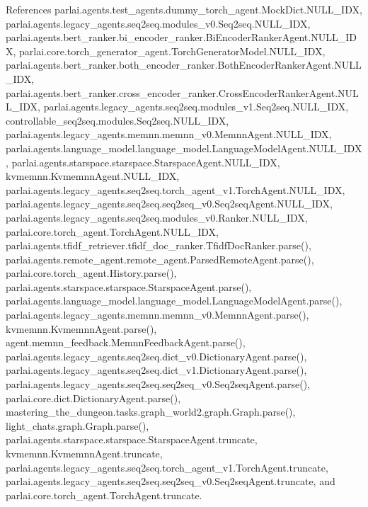 References parlai.\+agents.\+test\+\_\+agents.\+dummy\+\_\+torch\+\_\+agent.\+Mock\+Dict.\+N\+U\+L\+L\+\_\+\+I\+DX, parlai.\+agents.\+legacy\+\_\+agents.\+seq2seq.\+modules\+\_\+v0.\+Seq2seq.\+N\+U\+L\+L\+\_\+\+I\+DX, parlai.\+agents.\+bert\+\_\+ranker.\+bi\+\_\+encoder\+\_\+ranker.\+Bi\+Encoder\+Ranker\+Agent.\+N\+U\+L\+L\+\_\+\+I\+DX, parlai.\+core.\+torch\+\_\+generator\+\_\+agent.\+Torch\+Generator\+Model.\+N\+U\+L\+L\+\_\+\+I\+DX, parlai.\+agents.\+bert\+\_\+ranker.\+both\+\_\+encoder\+\_\+ranker.\+Both\+Encoder\+Ranker\+Agent.\+N\+U\+L\+L\+\_\+\+I\+DX, parlai.\+agents.\+bert\+\_\+ranker.\+cross\+\_\+encoder\+\_\+ranker.\+Cross\+Encoder\+Ranker\+Agent.\+N\+U\+L\+L\+\_\+\+I\+DX, parlai.\+agents.\+legacy\+\_\+agents.\+seq2seq.\+modules\+\_\+v1.\+Seq2seq.\+N\+U\+L\+L\+\_\+\+I\+DX, controllable\+\_\+seq2seq.\+modules.\+Seq2seq.\+N\+U\+L\+L\+\_\+\+I\+DX, parlai.\+agents.\+legacy\+\_\+agents.\+memnn.\+memnn\+\_\+v0.\+Memnn\+Agent.\+N\+U\+L\+L\+\_\+\+I\+DX, parlai.\+agents.\+language\+\_\+model.\+language\+\_\+model.\+Language\+Model\+Agent.\+N\+U\+L\+L\+\_\+\+I\+DX, parlai.\+agents.\+starspace.\+starspace.\+Starspace\+Agent.\+N\+U\+L\+L\+\_\+\+I\+DX, kvmemnn.\+Kvmemnn\+Agent.\+N\+U\+L\+L\+\_\+\+I\+DX, parlai.\+agents.\+legacy\+\_\+agents.\+seq2seq.\+torch\+\_\+agent\+\_\+v1.\+Torch\+Agent.\+N\+U\+L\+L\+\_\+\+I\+DX, parlai.\+agents.\+legacy\+\_\+agents.\+seq2seq.\+seq2seq\+\_\+v0.\+Seq2seq\+Agent.\+N\+U\+L\+L\+\_\+\+I\+DX, parlai.\+agents.\+legacy\+\_\+agents.\+seq2seq.\+modules\+\_\+v0.\+Ranker.\+N\+U\+L\+L\+\_\+\+I\+DX, parlai.\+core.\+torch\+\_\+agent.\+Torch\+Agent.\+N\+U\+L\+L\+\_\+\+I\+DX, parlai.\+agents.\+tfidf\+\_\+retriever.\+tfidf\+\_\+doc\+\_\+ranker.\+Tfidf\+Doc\+Ranker.\+parse(), parlai.\+agents.\+remote\+\_\+agent.\+remote\+\_\+agent.\+Parsed\+Remote\+Agent.\+parse(), parlai.\+core.\+torch\+\_\+agent.\+History.\+parse(), parlai.\+agents.\+starspace.\+starspace.\+Starspace\+Agent.\+parse(), parlai.\+agents.\+language\+\_\+model.\+language\+\_\+model.\+Language\+Model\+Agent.\+parse(), parlai.\+agents.\+legacy\+\_\+agents.\+memnn.\+memnn\+\_\+v0.\+Memnn\+Agent.\+parse(), kvmemnn.\+Kvmemnn\+Agent.\+parse(), agent.\+memnn\+\_\+feedback.\+Memnn\+Feedback\+Agent.\+parse(), parlai.\+agents.\+legacy\+\_\+agents.\+seq2seq.\+dict\+\_\+v0.\+Dictionary\+Agent.\+parse(), parlai.\+agents.\+legacy\+\_\+agents.\+seq2seq.\+dict\+\_\+v1.\+Dictionary\+Agent.\+parse(), parlai.\+agents.\+legacy\+\_\+agents.\+seq2seq.\+seq2seq\+\_\+v0.\+Seq2seq\+Agent.\+parse(), parlai.\+core.\+dict.\+Dictionary\+Agent.\+parse(), mastering\+\_\+the\+\_\+dungeon.\+tasks.\+graph\+\_\+world2.\+graph.\+Graph.\+parse(), light\+\_\+chats.\+graph.\+Graph.\+parse(), parlai.\+agents.\+starspace.\+starspace.\+Starspace\+Agent.\+truncate, kvmemnn.\+Kvmemnn\+Agent.\+truncate, parlai.\+agents.\+legacy\+\_\+agents.\+seq2seq.\+torch\+\_\+agent\+\_\+v1.\+Torch\+Agent.\+truncate, parlai.\+agents.\+legacy\+\_\+agents.\+seq2seq.\+seq2seq\+\_\+v0.\+Seq2seq\+Agent.\+truncate, and parlai.\+core.\+torch\+\_\+agent.\+Torch\+Agent.\+truncate.




